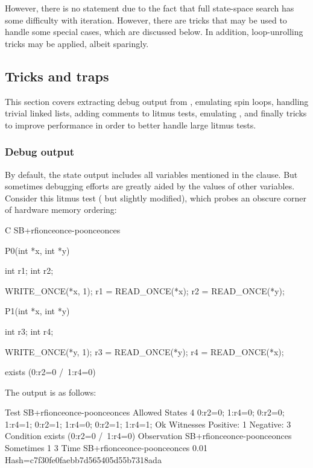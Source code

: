 However, there is no  statement due to the fact that full
state-space search has some difficulty with iteration.
However, there are tricks that may be used to handle some special cases,
which are discussed below.
In addition, loop-unrolling tricks may be applied, albeit sparingly.


\subsection{Tricks and traps}

This section covers extracting debug output from , emulating
spin loops, handling trivial linked lists, adding comments to litmus tests,
emulating , and finally tricks to improve  performance
in order to better handle large litmus tests.


\subsubsection{Debug output}

By default, the  state output includes all variables mentioned
in the  clause.
But sometimes debugging efforts are greatly aided by the values of other
variables.
Consider this litmus test
(
but
slightly modified), which probes an obscure corner of hardware memory ordering:

\begin{VerbatimN}[commandchars=\%\@\$]
	C SB+rfionceonce-poonceonces

	{}

	P0(int *x, int *y)
	{
		int r1;
		int r2;

		WRITE_ONCE(*x, 1);
		r1 = READ_ONCE(*x);
		r2 = READ_ONCE(*y);
	}

	P1(int *x, int *y)
	{
		int r3;
		int r4;

		WRITE_ONCE(*y, 1);
		r3 = READ_ONCE(*y);
		r4 = READ_ONCE(*x);
	}

	exists (0:r2=0 /\ 1:r4=0)
\end{VerbatimN}

The  output is as follows:

\begin{VerbatimN}
	Test SB+rfionceonce-poonceonces Allowed
	States 4
	0:r2=0; 1:r4=0;
	0:r2=0; 1:r4=1;
	0:r2=1; 1:r4=0;
	0:r2=1; 1:r4=1;
	Ok
	Witnesses
	Positive: 1 Negative: 3
	Condition exists (0:r2=0 /\ 1:r4=0)
	Observation SB+rfionceonce-poonceonces Sometimes 1 3
	Time SB+rfionceonce-poonceonces 0.01
	Hash=c7f30fe0faebb7d565405d55b7318ada
\end{VerbatimN}

